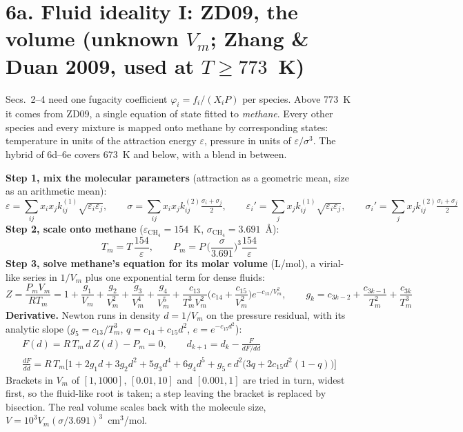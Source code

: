 \documentclass[11pt]{article}
\begin{document}
\vspace*{\fill}
\clearpage
\section*{6a. Fluid ideality I: ZD09, the volume \quad (unknown $V_m$; Zhang \& Duan 2009, used at $T\ge773$~K)}
{\large\setlength{\abovedisplayskip}{13pt}\setlength{\belowdisplayskip}{13pt}\setlength{\abovedisplayshortskip}{13pt}\setlength{\belowdisplayshortskip}{13pt}
Secs.~2--4 need one fugacity coefficient $\varphi_i=f_i/(X_iP)$ per species. Above 773~K it comes from ZD09, a single equation of state fitted to \emph{methane}. Every other species and every mixture is mapped onto methane by corresponding states: temperature in units of the attraction energy $\varepsilon$, pressure in units of $\varepsilon/\sigma^3$. The hybrid of 6d--6e covers 673~K and below, with a blend in between.

\textbf{Step 1, mix the molecular parameters} (attraction as a geometric mean, size as an arithmetic mean):
\begin{equation}
  \varepsilon=\sum_{ij}x_ix_jk^{(1)}_{ij}\sqrt{\varepsilon_i\varepsilon_j},\qquad
  \sigma=\sum_{ij}x_ix_jk^{(2)}_{ij}\tfrac{\sigma_i+\sigma_j}{2},\qquad
  \varepsilon_i'=\sum_jx_jk^{(1)}_{ij}\sqrt{\varepsilon_i\varepsilon_j},\qquad
  \sigma_i'=\sum_jx_jk^{(2)}_{ij}\tfrac{\sigma_i+\sigma_j}{2}
\end{equation}
\textbf{Step 2, scale onto methane} ($\varepsilon_{\mathrm{CH_4}}=154$~K, $\sigma_{\mathrm{CH_4}}=3.691$~\AA):
\begin{equation}
  T_m= T\,\frac{154}{\varepsilon},\qquad P_m= P\,\Big(\frac{\sigma}{3.691}\Big)^3\frac{154}{\varepsilon}
\end{equation}
\textbf{Step 3, solve methane's equation for its molar volume} (L/mol), a virial-like series in $1/V_m$ plus one exponential term for dense fluids:
\begin{equation}
  Z=\frac{P_mV_m}{RT_m}=1+\frac{g_1}{V_m}+\frac{g_2}{V_m^2}+\frac{g_3}{V_m^4}+\frac{g_4}{V_m^5}
   +\frac{c_{13}}{T_m^3V_m^2}\Big(c_{14}+\frac{c_{15}}{V_m^2}\Big)e^{-c_{15}/V_m^2},\qquad
   g_k=c_{3k-2}+\frac{c_{3k-1}}{T_m^2}+\frac{c_{3k}}{T_m^3}
\end{equation}
\textbf{Derivative.} Newton runs in density $ d=1/V_m$ on the pressure residual, with its analytic slope ($g_5=c_{13}/T_m^3$, $q=c_{14}+c_{15} d^2$, $e=e^{-c_{15} d^2}$):
\begin{gather}
  F( d)= R\,T_m\, d\,Z( d)-P_m=0,\qquad d_{k+1}=d_k-\frac{F}{dF/d d}\nonumber\\
  \frac{dF}{d d}= R\,T_m\Big[1+2g_1 d+3g_2 d^2+5g_3 d^4+6g_4 d^5+g_5\,e\, d^2\big(3q+2c_{15} d^2(1-q)\big)\Big]
\end{gather}
Brackets in $V_m$ of $[1,1000]$, $[0.01,10]$ and $[0.001,1]$ are tried in turn, widest first, so the fluid-like root is taken; a step leaving the bracket is replaced by bisection. The real volume scales back with the molecule size, $V=10^3V_m(\sigma/3.691)^3$~cm$^3$/mol.

}
\end{document}
